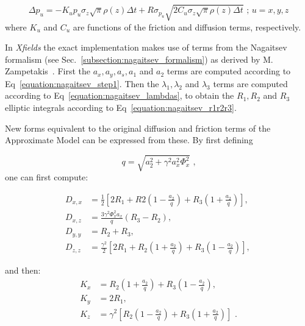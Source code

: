 \begin{equation}
    \Delta p_u = - K_u p_u \sigma_z \sqrt{\pi} \rho(z) \Delta t + R \sigma_{p_u} \sqrt{2 C_u \sigma_z \sqrt{\pi} \rho(z) \Delta t} \text{ ;   } u=x,y,z
    \label{equation:original_kinetic_kick}
\end{equation}
where \(K_u\) and \(C_u\) are functions of the friction and diffusion terms, respectively.
\newline

In \textit{Xfields} the exact implementation makes use of terms from the Nagaitsev formalism (see Sec.~\ref{subsection:nagaitsev_formalism}) as derived by M. Zampetakis~\cite{arXiv:Zampetakis:Interplay_SC_IBS_LHC_Chain}.
First the \(a_x, a_y, a_s, a_1\) and \(a_2\) terms are computed according to Eq~\eqref{equation:nagaitsev_step1}.
Then the \(\lambda_1, \lambda_2\) and \(\lambda_3\) terms are computed according to Eq~\eqref{equation:nagaitsev_lambdas}, to obtain the \(R_1, R_2\) and \(R_3\) elliptic integrals according to Eq~\eqref{equation:nagaitsev_r1r2r3}.
\newline

New forms equivalent to the original diffusion and friction terms of the Approximate Model can be expressed from these.
By first defining

\begin{equation}
    q = \sqrt{a_2^{2} + \gamma^2 a_x^{2} \Phi_x^2} \text{ ,}
\end{equation}
one can first compute:

\begin{equation}
    \begin{aligned}
        D_{x,x} &= \frac{1}{2} \left[ 2 R_1 + R2 \left(1 - \frac{a_2}{q}\right) + R_3 \left(1 + \frac{a_2}{q}\right) \right] \text{,  } \\
        D_{x,z} &= \frac{3 \gamma^2 \Phi_x^2 a_x}{q} \left(R_3 - R_2\right) \text{,  }  \\
        D_{y,y} &= R_2 + R_3 \text{,  }  \\
        D_{z,z} &= \frac{\gamma^2}{2} \left[ 2 R_1 +  R_2 \left(1 + \frac{a_2}{q}\right) + R_3 \left(1 - \frac{a_2}{q}\right) \right] \text{, }
    \end{aligned}
    \label{equation:kinetic_AM_diffusion_terms}
\end{equation}

and then:
\begin{equation}
    \begin{aligned}
        K_x &= R_2 \left(1 + \frac{a_2}{q}\right) + R_3 \left(1 - \frac{a_2}{q}\right) \text{,  } \\
        K_y &= 2 R_1 \text{,  }  \\
        K_z &= \gamma^2 \left[ R_2 \left(1 - \frac{a_2}{q}\right) + R_3 \left(1 + \frac{a_2}{q}\right) \right] \text{ .}
    \end{aligned}
    \label{equation:kinetic_AM_friction_terms}
\end{equation}


